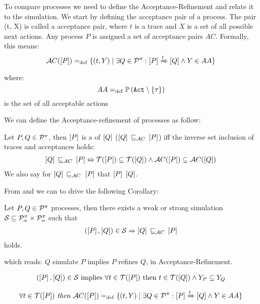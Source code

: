 To compare \picalc{} processes we need to define the Acceptance-Refinement and relate it to the simulation. We start by defining the acceptance pair of a process.
The pair (t, X) is called a acceptance pair, where $t$ is a trace and $X$ is a set of all possible next actions. Any process
$P$ is assigned a set of acceptance pairs $AC$. Formally, this means:
\begin{align}
    \accepatances[P] \define \{(t,Y) \mid \exists Q\in\procs: \ec{P} \bigstep{t} \ec{Q}\wedge Y\in AA\}
\label{failure}
\end{align}
where: \[AA \define \pom{\actions\setminus\set{\tau}}\] is the set of all acceptable actions

We can define the Acceptance-refinement of \picalc{} processes as follow:

\begin{definition}
\label{def_failure_ref}
	Let $P,Q\in\mathcal P^{\pi}$, then $\left[P\right]$ is a  of $\left[Q\right]$ ($\ec{Q}\refiAC \ec{P}$) iff the inverse set inclusion of traces and acceptances holds:
\begin{align}
   \ec{Q} \refiAC \ec{P} \Leftrightarrow  \traces[P]\subseteq\traces[Q] \wedge \accepatances[P]\subseteq\accepatances[Q]
\end{align}
	We also say for $\ec{Q}\refiAC{}\ec{P}$ that $\left[P\right]$  $\left[Q\right]$.
\end{definition}

From  and  we can to drive the following Corollary: 

\begin{cor}
\label{cor_sim_acceptance_refinement}
Let $P,Q\in\mathcal P^{\pi}$ processes, then there exists a weak or strong simulation $\mathcal{S}\subseteq\mathcal P^{\pi}_\alpha\times\mathcal P^{\pi}_\alpha$ such that
\begin{align}
    (\ec{P},\ec{Q})\in{}\simu  \Rightarrow \ec{Q} \refiAC \ec{P}
   \label{acceptance_model}
\end{align}
holds.
\end{cor}%
which reads:  $Q$ simulate $P$ implies $P$ refines $Q$, in Acceptance-Refinement.

\begin{prf}
\item 
\begin{align*}
	(\ec{P},\ec{Q})\in\simu \text{ implies } \forall t \in\traces[P] \text{ then } t \in  \traces[Q] \wedge Y_P \subseteq Y_Q
\end{align*}

\begin{align}
    \forall t \in \traces[P] \textit{ then }\accepatances[P] \define \{(t,Y) \mid \exists Q\in\procs: \ec{P} \bigstep{t} \ec{Q}\wedge Y\in AA\}
\label{failure}
\end{align}

\end{prf}